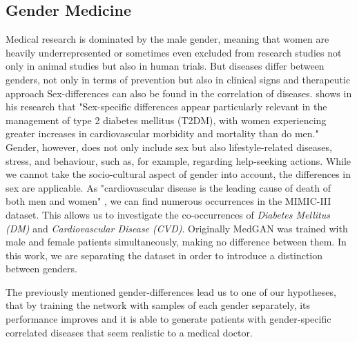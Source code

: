 \documentclass[11pt, a4paper, oneside]{book}
\begin{document}
\subsection{Gender Medicine}
Medical research is dominated by the male gender, meaning that women are heavily underrepresented or sometimes even excluded from research studies not only in animal studies but also in human trials. \citep{baggio2013gender} 
But diseases differ between genders, not only in terms of prevention but also in clinical signs and therapeutic approach  \citep{baggio2013gender}
Sex-differences can also be found in the correlation of diseases. \citep{kautzky2010sex} shows in his research that "Sex-specific differences appear particularly relevant in the management of type 2 diabetes mellitus (T2DM), with women experiencing greater increases in cardiovascular morbidity and mortality than do men." \citep{kautzky2010sex}
Gender, however, does not only include sex but also lifestyle-related diseases, stress, and behaviour, such as, for example, regarding help-seeking actions.
While we cannot take the socio-cultural aspect of gender into account, the differences in sex are applicable.
As "cardiovascular disease is the leading cause of death of both men and women" \citep{arain2009sex}, we can find numerous occurrences in the MIMIC-III dataset. This allows us to investigate the co-occurrences of \textit{Diabetes Mellitus (DM)} and \textit{Cardiovascular Disease (CVD)}.
Originally MedGAN was trained with male and female patients simultaneously, making no difference between them. In this work, we are separating the dataset in order to introduce a distinction between genders.

The previously mentioned gender-differences lead us to one of our hypotheses, that by training the network with samples of each gender separately, its performance improves and it is able to generate patients with gender-specific correlated diseases that seem realistic to a medical doctor.
\end{document}
